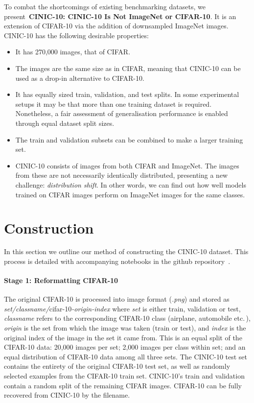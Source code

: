 \documentclass[coverpage]{Style/inftechrep}
\begin{document}
To combat the shortcomings of existing benchmarking datasets, we present{~\bf CINIC-10: CINIC-10 Is Not ImageNet or CIFAR-10}. It is an extension of CIFAR-10 via the addition of downsampled ImageNet images. CINIC-10 has the following desirable properties:

\begin{itemize}
\item It has 270,000 images,  that of CIFAR.
\item The images are the same size as in CIFAR, meaning that CINIC-10 can be used as a drop-in alternative to CIFAR-10.
\item It has equally sized train, validation, and test splits. In some experimental setups it may be that more than one training dataset is required. Nonetheless, a fair assessment of generalisation performance is enabled through equal dataset split sizes. 
\item The train and validation subsets can be combined to make a larger training set.
\item CINIC-10 consists of images from both CIFAR and ImageNet. The images from these are not necessarily identically distributed, presenting a new challenge: \emph{distribution shift}. In other words, we can find out how well models trained on CIFAR images perform on ImageNet images for the same classes.

\end{itemize}





\section{Construction}

In this section we outline our method of constructing the CINIC-10 dataset. This process is detailed with accompanying notebooks in the github repository~\citep{cinic2018github}. 

\paragraph{Stage 1: Reformatting CIFAR-10} 
The original CIFAR-10 is processed into image format (\textit{.png}) and stored as {\it set/classname/}cifar-10{\it-origin-index} where {\it set} is either train, validation or test, {\it classname} refers to the corresponding CIFAR-10 class (airplane, automobile etc.\,), {\it origin} is the set from which the image was taken (train or test), and {\it index} is the original index of the image in the set it came from. This is an equal split of the CIFAR-10 data: 20,000 images per set; 2,000 images per class within set; and an equal distribution of CIFAR-10 data among all three sets. The CINIC-10 test set contains the entirety of the original CIFAR-10 test set, as well as randomly selected examples from the CIFAR-10 train set. CINIC-10's train and validation contain a random split of the remaining CIFAR images. CIFAR-10 can be fully recovered from CINIC-10 by the filename. 
\end{document}
